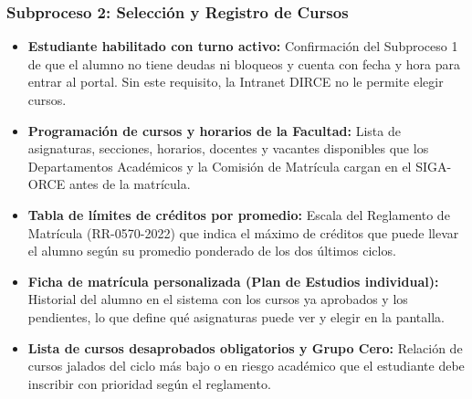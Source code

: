 \subsubsection{Subproceso 2: Selección y Registro de Cursos}

\begin{itemize}
    \item \textbf{Estudiante habilitado con turno activo:} Confirmación del Subproceso 1 de que el alumno no tiene deudas ni bloqueos y cuenta con fecha y hora para entrar al portal. Sin este requisito, la Intranet DIRCE no le permite elegir cursos.

    \item \textbf{Programación de cursos y horarios de la Facultad:} Lista de asignaturas, secciones, horarios, docentes y vacantes disponibles que los Departamentos Académicos y la Comisión de Matrícula cargan en el SIGA-ORCE antes de la matrícula.

    \item \textbf{Tabla de límites de créditos por promedio:} Escala del Reglamento de Matrícula (RR-0570-2022) que indica el máximo de créditos que puede llevar el alumno según su promedio ponderado de los dos últimos ciclos.

    \item \textbf{Ficha de matrícula personalizada (Plan de Estudios individual):} Historial del alumno en el sistema con los cursos ya aprobados y los pendientes, lo que define qué asignaturas puede ver y elegir en la pantalla.

    \item \textbf{Lista de cursos desaprobados obligatorios y Grupo Cero:} Relación de cursos jalados del ciclo más bajo o en riesgo académico que el estudiante debe inscribir con prioridad según el reglamento.
\end{itemize}
